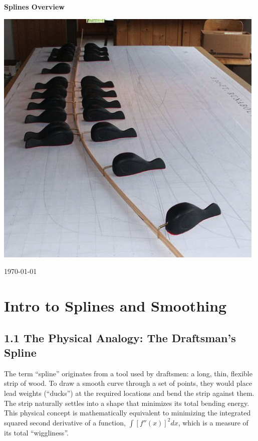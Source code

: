 \documentclass[11pt, a4paper]{article}
\begin{document}
\begin{titlepage}
 \centering %
 
 \vspace*{1cm} %
 
 {\Huge \bfseries Splines Overview}
 
 \vspace{2cm} %
 
 \includegraphics[width=0.6\linewidth]{spline-ducks.png}
 
 \vfill %
  
 \vspace{1cm}
 
 {\large \today}

\end{titlepage}

\tableofcontents
\newpage
\section{Intro to Splines and Smoothing}
\subsection{1.1 The Physical Analogy: The Draftsman's Spline}
The term ``spline'' originates from a tool used by draftsmen: a long, thin, flexible strip of wood. To draw a smooth curve through a set of points, they would place lead weights (``ducks'') at the required locations and bend the strip against them. The strip naturally settles into a shape that minimizes its total bending energy. This physical concept is mathematically equivalent to minimizing the integrated squared second derivative of a function, $\int [f''(x)]^2 dx$, which is a measure of its total ``wiggliness''.
\end{document}
